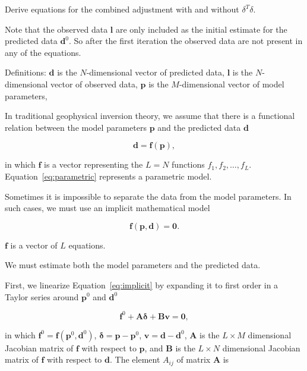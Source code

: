 \documentclass[onecolumn]{article}
\begin{document}
Derive equations for the combined adjustment with and without $\delta^T\delta$.

Note that the observed data $\mathbf{l}$
are only included
as the initial estimate
for the predicted data $\mathbf{d}^0$.
So after the first iteration
the observed data are not present
in any of the equations.

Definitions:
$\mathbf{d}$ is the $N$-dimensional vector of predicted data,
$\mathbf{l}$ is the $N$-dimensional vector of observed data,
$\mathbf{p}$ is the $M$-dimensional vector of model parameters,

In traditional geophysical inversion theory,
we assume that there is a functional relation between
the model parameters $\mathbf{p}$
and the predicted data $\mathbf{d}$

\begin{equation}
    \mathbf{d} = \mathbf{f}(\mathbf{p}),
    \label{eq:parametric}
\end{equation}

\noindent
in which $\mathbf{f}$ is a vector representing the $L = N$ functions
$f_1, f_2, \ldots, f_L$.
Equation~\ref{eq:parametric} represents a parametric model.



Sometimes it is impossible to separate the data from the model parameters.
In such cases,
we must use an implicit mathematical model

\begin{equation}
    \mathbf{f}(\mathbf{p}, \mathbf{d}) = \mathbf{0}.
    \label{eq:implicit}
\end{equation}

$\mathbf{f}$ is a vector of $L$ equations.

We must estimate both the model parameters and the predicted data.

First, we linearize Equation~\ref{eq:implicit} by expanding it to first order
in a Taylor series around $\mathbf{p}^0$ and $\mathbf{d}^0$

\begin{equation}
    \mathbf{f}^0 + \mathbf{A}\mathbf{\delta} + \mathbf{B}\mathbf{v} =
    \mathbf{0},
    \label{eq:implicit-taylor}
\end{equation}

\noindent
in which
$\mathbf{f}^0 = \mathbf{f}(\mathbf{p}^0, \mathbf{d}^0)$,
$\mathbf{\delta} = \mathbf{p} - \mathbf{p}^0$,
$\mathbf{v} = \mathbf{d} - \mathbf{d}^0$,
$\mathbf{A}$ is
the $L \times M$ dimensional Jacobian matrix of $\mathbf{f}$
with respect to $\mathbf{p}$,
and
$\mathbf{B}$ is
the $L \times N$ dimensional Jacobian matrix of $\mathbf{f}$
with respect to $\mathbf{d}$.
The element $A_{ij}$ of matrix $\mathbf{A}$ is
\end{document}
